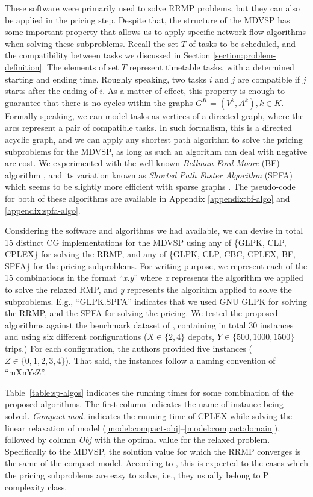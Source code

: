 \documentclass{article}
\begin{document}
These software were primarily used to solve RRMP problems, but they can also be applied in the pricing step. Despite that, the structure of the MDVSP has some important property that allows us to apply specific network flow algorithms when solving these subproblems. Recall the set $T$ of tasks to be scheduled, and the compatibility between tasks we discussed in Section \ref{section:problem-definition}. The elements of set $T$ represent timetable tasks, with a determined starting and ending time. Roughly speaking, two tasks $i$ and $j$ are compatible if $j$ starts after the ending of $i$. As a matter of effect, this property is enough to guarantee that there is no cycles within the graphs $G^K=(V^k, A^k), k \in K$. Formally speaking, we can model tasks as vertices of a directed graph, where the arcs represent a pair of compatible tasks. In such formalism, this is a directed acyclic graph, and we can apply any shortest path algorithm to solve the pricing subproblems for the MDVSP, as long as such an algorithm can deal with negative arc cost. We experimented with the well-known \textit{Bellman-Ford-Moore} (BF) algorithm \citep{bang2008-bellman-ford-moore}, and its variation known as \textit{Shorted Path Faster Algorithm} (SPFA) which seems to be slightly more efficient with sparse graphs \citep{fanding1994-spfa}. The pseudo-code for both of these algorithms are available in Appendix \ref{appendix:bf-algo} and \ref{appendix:spfa-algo}.


Considering the software and algorithms we had available, we can devise in total 15 distinct CG implementations for the MDVSP using any of \{GLPK, CLP, CPLEX\} for solving the RRMP, and any of \{GLPK, CLP, CBC, CPLEX, BF, SPFA\} for the pricing subproblems. For writing purpose, we represent each of the 15 combinations in the format ``\textit{x.y}'' where \textit{x} represents the algorithm we applied to solve the relaxed RMP, and \textit{y} represents the algorithm applied to solve the subproblems. E.g., ``GLPK.SPFA'' indicates that we used GNU GLPK for solving the RRMP, and the SPFA for solving the pricing. We tested the proposed algorithms against the benchmark dataset of \citet{pepin2009}, containing in total 30 instances and using six different configurations ($X \in \{2,4\}$ depots, $Y \in \{500,1000,1500\}$ trips.) For each configuration, the authors provided five instances ($Z \in \{0, 1, 2, 3, 4\}$). That said, the instances follow a naming convention of ``mXnYsZ''.

Table~\ref{table:sp-algos} indicates the running times for some combination of the proposed algorithms. The first column indicates the name of instance being solved. \textit{Compact mod.} indicates the running time of CPLEX while solving the linear relaxation of model (\ref{model:compact-obj}--\ref{model:compact:domain}), followed by column \textit{Obj} with the optimal value for the relaxed problem. Specifically to the MDVSP, the solution value for which the RRMP converges is the same of the compact model. According to \citet{desaulniers2006}, this is expected to the cases which the pricing subproblems are easy to solve, i.e., they usually belong to \textsf P complexity class.
\end{document}
